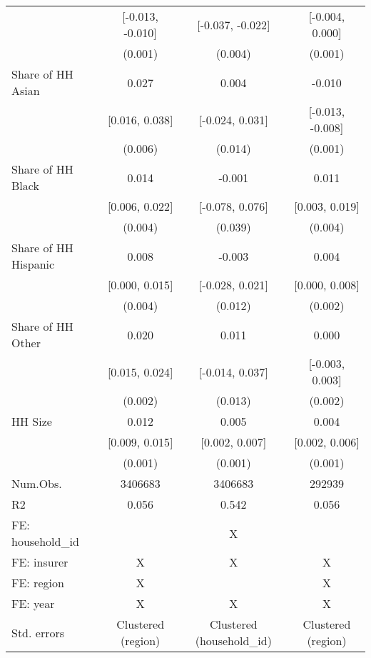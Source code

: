 \begin{table}[H]
\begin{table}[H]
\begin{tabular}[t]{lccc}
 & [-0.013, -0.010] & [-0.037, -0.022] & [-0.004, 0.000]\\
 & (0.001) & (0.004) & (0.001)\\
Share of HH Asian & 0.027 & 0.004 & -0.010\\
 & [0.016, 0.038] & [-0.024, 0.031] & [-0.013, -0.008]\\
 & (0.006) & (0.014) & (0.001)\\
Share of HH Black & 0.014 & -0.001 & 0.011\\
 & [0.006, 0.022] & [-0.078, 0.076] & [0.003, 0.019]\\
 & (0.004) & (0.039) & (0.004)\\
Share of HH Hispanic & 0.008 & -0.003 & 0.004\\
 & [0.000, 0.015] & [-0.028, 0.021] & [0.000, 0.008]\\
 & (0.004) & (0.012) & (0.002)\\
Share of HH Other & 0.020 & 0.011 & 0.000\\
 & [0.015, 0.024] & [-0.014, 0.037] & [-0.003, 0.003]\\
 & (0.002) & (0.013) & (0.002)\\
HH Size & 0.012 & 0.005 & 0.004\\
 & [0.009, 0.015] & [0.002, 0.007] & [0.002, 0.006]\\
 & (0.001) & (0.001) & (0.001)\\
\midrule
Num.Obs. & 3406683 & 3406683 & 292939\\
R2 & 0.056 & 0.542 & 0.056\\
FE: household\_id &  & X & \\
FE: insurer & X & X & X\\
FE: region & X &  & X\\
FE: year & X & X & X\\
Std. errors & Clustered (region) & Clustered (household\_id) & Clustered (region)\\
\bottomrule
\end{tabular}
\end{table}
\end{table}

